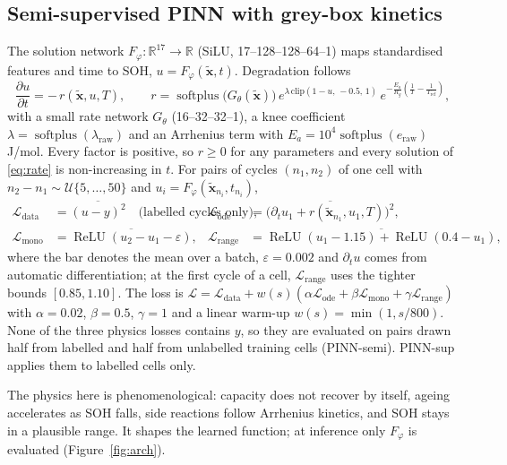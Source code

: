 \documentclass[11pt,a4paper]{article}
\newcommand{\Lc}{\mathcal{L}}
\begin{document}
\subsection{Semi-supervised PINN with grey-box kinetics}
The solution network $F_\varphi:\mathbb{R}^{17}\to\mathbb{R}$ (SiLU, 17--128--128--64--1) maps standardised features
and time to SOH, $u = F_\varphi(\tilde{\mathbf{x}}, t)$. Degradation follows
\begin{equation}\label{eq:rate}
\frac{\partial u}{\partial t} = -\,r(\tilde{\mathbf{x}}, u, T), \qquad
r = \operatorname{softplus}\big(G_\theta(\tilde{\mathbf{x}})\big)\,
e^{\lambda\,\mathrm{clip}(1-u,\,-0.5,\,1)}\,
e^{-\frac{E_a}{R_g}\left(\frac{1}{T} - \frac{1}{T_\text{ref}}\right)},
\end{equation}
with a small rate network $G_\theta$ (16--32--32--1), a knee coefficient $\lambda = \operatorname{softplus}(\lambda_\text{raw})$
and an Arrhenius term with $E_a = 10^4\operatorname{softplus}(e_\text{raw})$\,J/mol. Every factor is positive, so
$r \ge 0$ for any parameters and every solution of \eqref{eq:rate} is non-increasing in $t$. For pairs of cycles
$(n_1, n_2)$ of one cell with $n_2 - n_1 \sim \mathcal{U}\{5,\dots,50\}$ and $u_i = F_\varphi(\tilde{\mathbf{x}}_{n_i}, t_{n_i})$,
\begin{align}
\Lc_\text{data} &= \overline{(u - y)^2}\quad\text{(labelled cycles only)}, &
\Lc_\text{ode} &= \overline{\big(\partial_t u_1 + r(\tilde{\mathbf{x}}_{n_1}, u_1, T)\big)^2}, \\
\Lc_\text{mono} &= \overline{\operatorname{ReLU}(u_2 - u_1 - \varepsilon)}, &
\Lc_\text{range} &= \overline{\operatorname{ReLU}(u_1 - 1.15) + \operatorname{ReLU}(0.4 - u_1)},
\end{align}
where the bar denotes the mean over a batch, $\varepsilon = 0.002$ and $\partial_t u$ comes from automatic
differentiation; at the first cycle of a cell,
$\Lc_\text{range}$ uses the tighter bounds $[0.85, 1.10]$. The loss is
$\Lc = \Lc_\text{data} + w(s)(\alpha\Lc_\text{ode} + \beta\Lc_\text{mono} + \gamma\Lc_\text{range})$ with
$\alpha = 0.02$, $\beta = 0.5$, $\gamma = 1$ and a linear warm-up $w(s) = \min(1, s/800)$. None of the three physics
losses contains $y$, so they are evaluated on pairs drawn half from labelled and half from unlabelled training cells
(PINN-semi). PINN-sup applies them to labelled cells only.

The physics here is phenomenological: capacity does not recover by itself, ageing accelerates as SOH falls, side
reactions follow Arrhenius kinetics, and SOH stays in a plausible range. It shapes the learned function; at inference
only $F_\varphi$ is evaluated (Figure~\ref{fig:arch}).
\end{document}
